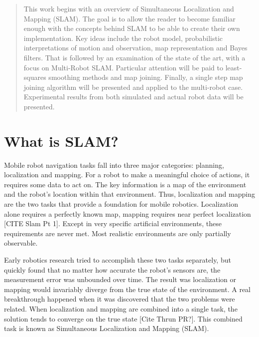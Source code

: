 
\maketitle

\begin{abstract}
This work begins with an overview of Simultaneous Localization and Mapping (SLAM).  The goal is to allow the reader to become familiar enough with the concepts behind SLAM to be able to create their own implementation.  Key ideas include the robot model, probabilistic interpretations of motion and observation, map representation and Bayes filters.  That is followed by an examination of the state of the art, with a focus on Multi-Robot SLAM.  Particular attention will be paid to least-squares smoothing methods and map joining.  Finally, a single step map joining algorithm will be presented and applied to the multi-robot case.  Experimental results from both simulated and actual robot data will be presented.  
\end{abstract}

\section{What is SLAM?}

Mobile robot navigation tasks fall into three major categories: planning, localization and mapping.  For a robot to make a meaningful choice of actions, it requires some data to act on.  The key information is a map of the environment and the robot's location within that environment.  Thus, localization and mapping are the two tasks that provide a foundation for mobile robotics.  Localization alone requires a perfectly known map, mapping requires near perfect localization [CITE Slam Pt 1].  Except in very specific artificial environments, these requirements are never met.  Most realistic environments are only partially observable.  

Early robotics research tried to accomplish these two tasks separately, but quickly found that no matter how accurate the robot's sensors are, the measurement error was unbounded over time.  The result was localization or mapping would invariably diverge from the true state of the environment.  A real breakthrough happened when it was discovered that the two problems were related.  When localization and mapping are combined into a single task, the solution tends to converge on the true state [Cite Thrun PR?].  This combined task is known as Simultaneous Localization and Mapping (SLAM).

